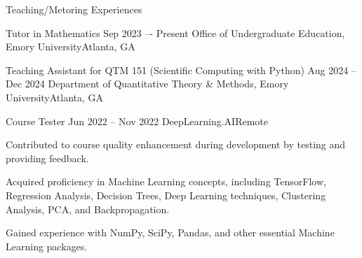 \documentclass[10pt, letterpaper]{resume} %
\begin{document}
\begin{rSection}{Teaching/Metoring Experiences} \itemsep -3pt

\begin{rSubsection}
	{Tutor in Mathematics}
	{Sep 2023 –- Present}
	{Office of Undergraduate Education, Emory University\hfill{Atlanta, GA}}
	\item 
\end{rSubsection}

\begin{rSubsection}
	{Teaching Assistant for QTM 151 (Scientific Computing with Python)}
	{Aug 2024 -- Dec 2024}
	{Department of Quantitative Theory \& Methods, Emory University\hfill{Atlanta, GA}}
	\item 
\end{rSubsection}

\begin{rSubsection}
	{Course Tester}
	{Jun 2022 -- Nov 2022}
	{DeepLearning.AI\hfill{Remote}}
	
	\item Contributed to course quality enhancement during development by testing and providing feedback. 
	\item Acquired proficiency in Machine Learning concepts, including TensorFlow, Regression Analysis, Decision Trees, Deep Learning techniques, Clustering Analysis, PCA, and Backpropagation.
	\item Gained experience with NumPy, SciPy, Pandas, and other essential Machine Learning packages.
\end{rSubsection}
\end{rSection}


\end{document}
